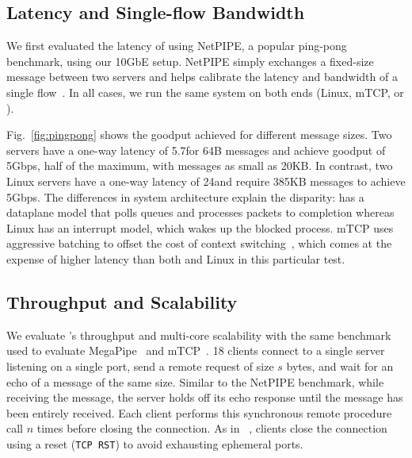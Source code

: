 \subsection{Latency and Single-flow Bandwidth}
\label{sec:eval:netpipe}

We first evaluated the latency of \ix using NetPIPE, a popular
ping-pong benchmark, using our 10GbE setup.  NetPIPE simply exchanges
a fixed-size message between two servers and helps calibrate the
latency and bandwidth of a single flow~\cite{snell1996netpipe}.  In
all cases, we run the same system on both ends (Linux, mTCP, or \ix).

Fig.~\ref{fig:pingpong} shows the goodput achieved for different
message sizes.  Two \ix servers have a one-way latency of
5.7\microsecond for 64B messages and achieve goodput of 5Gbps, half of
the maximum, with messages as small as 20KB. In contrast, two Linux
servers have a one-way latency of 24\microsecond and require 385KB
messages to achieve 5Gbps.  The differences in system architecture
explain the disparity: \ix has a dataplane model that polls queues and
processes packets to completion whereas Linux has an interrupt model,
which wakes up the blocked process.  mTCP uses aggressive batching to
offset the cost of context switching~\cite{jeong2014mtcp}, which comes
  at the expense of higher latency than both \ix and Linux in this
  particular test.

 


  \subsection{Throughput and Scalability}
\label{sec:eval:short}

We evaluate \ix's throughput and multi-core scalability with the same
benchmark used to evaluate MegaPipe~\cite{DBLP:conf/osdi/HanMCR12} and
mTCP~\cite{jeong2014mtcp}. {18} clients connect to a single server
listening on a single port, send a remote request of size $s$ bytes,
and wait for an echo of a message of the same size.  Similar to the
NetPIPE benchmark, while receiving the message, the server holds off
its echo response until the message has been entirely received.  Each
client performs this synchronous remote procedure call $n$ times
before closing the connection.  As in ~\cite{jeong2014mtcp}, clients
close the connection using a reset (\texttt{TCP RST}) to avoid
exhausting ephemeral ports.


